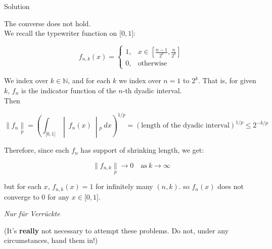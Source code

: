 \documentclass{qlnotes-export}
\begin{document}
\begin{qlsolution}{Solution}

The converse does not hold.\\
We recall the typewriter function on \(\lbrack 0,1\rbrack\):

\[f_{n,k}(x) = \left\{ \begin{matrix}
{1,} & {x \in \left\lbrack {\frac{n - 1}{2^{k}},\frac{n}{2^{k}}} \right\rbrack} \\
{0,} & \text{otherwise}
\end{matrix} \right.\]

We index over \(k \in {\mathbb{N}}\), and for each \(k\) we index over \(n = 1\) to \(2^{k}\). That is, for given \(k\), \(f_{n}\) is the indicator function of the \(n\)-th dyadic interval.\\
Then

\[\parallel f_{n}\underset{p}{\parallel} = \left( \int_{\lbrack 0,1\rbrack} \middle| \ f_{n}(x)\  \middle| {}_{p}\ dx \right)^{1/p} = \left( \text{length of the dyadic interval} \right)^{1/p} \leq 2^{- k/p}\]

Therefore, since each \(f_{n}\) has support of shrinking length, we get:

\[\parallel f_{n,k}\underset{p}{\parallel}\rightarrow 0\quad\text{as}\ k\rightarrow\infty\]

but for each \(x\), \(f_{n,k}(x) = 1\) for infinitely many \((n,k)\). so \(f_{n}(x)\) does not converge to 0 for any \(x \in \lbrack 0,1\rbrack\).

\end{qlsolution}

\emph{Nur für Verrückte}

(It's \textbf{really} not necessary to attempt these problems. Do not, under any circumstances, hand them in!)
\end{document}
